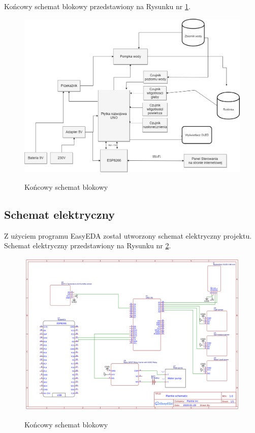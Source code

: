 \documentclass[12pt]{article}
\begin{document}
Końcowy schemat blokowy przedstawiony na Rysunku nr \ref{fig:koncowyschemat}.
\begin{figure}[!h]
	\begin{center}
		{\includegraphics[width=16cm]{schemat_blokowy_koncowy.png}}
	\end{center}
	\caption{Końcowy schemat blokowy}
	\label{fig:koncowyschemat}
\end{figure}

\newpage
\subsection{Schemat elektryczny}
Z użyciem programu EasyEDA został utworzony schemat elektryczny projektu.
Schemat elektryczny przedstawiony na Rysunku nr \ref{fig:elekschemat}.
\begin{figure}[!h]
	\begin{center}
		{\includegraphics[width=17cm]{schemat_elek.png}}
	\end{center}
	\caption{Końcowy schemat blokowy}
	\label{fig:elekschemat}
\end{figure}
\end{document}
